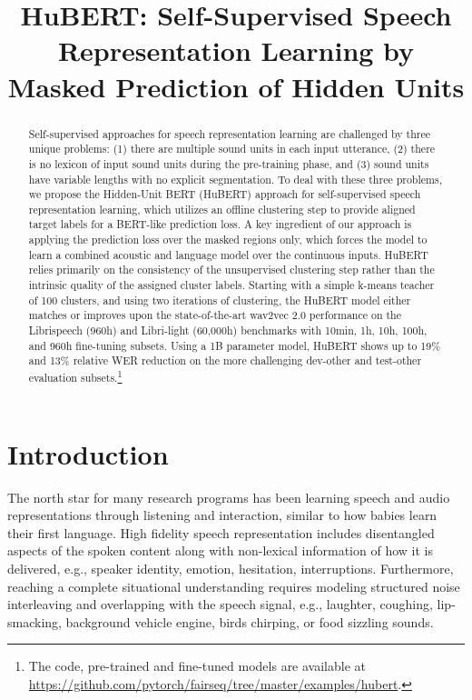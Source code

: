 \title{HuBERT: Self-Supervised Speech Representation Learning by Masked Prediction of Hidden Units}

\begin{abstract}
Self-supervised approaches for speech representation learning are challenged by three unique problems: (1) there are multiple sound units in each input utterance, (2) there is no lexicon of input sound units during the pre-training phase, and (3) sound units have variable lengths with no explicit segmentation. To deal with these three problems, we propose the Hidden-Unit BERT (HuBERT) approach for self-supervised speech representation learning, which utilizes an offline clustering step to provide aligned target labels for a BERT-like prediction loss. A key ingredient of our approach is applying the prediction loss over the masked regions only, which forces the model to learn a combined acoustic and language model over the continuous inputs. HuBERT relies primarily on the consistency of the unsupervised clustering step rather than the intrinsic quality of the assigned cluster labels. Starting with a simple k-means teacher of 100 clusters, and using two iterations of clustering, the HuBERT model either matches or improves upon the state-of-the-art wav2vec 2.0 performance on the Librispeech (960h) and Libri-light (60,000h) benchmarks with 10min, 1h, 10h, 100h, and 960h fine-tuning subsets. Using a 1B parameter model, HuBERT shows up to 19\% and 13\% relative WER reduction on the more challenging dev-other and test-other evaluation subsets.\footnote{The code, pre-trained and fine-tuned models are available at \url{https://github.com/pytorch/fairseq/tree/master/examples/hubert}.}
\end{abstract}

\section{Introduction}
\label{sec:intro}
The north star for many research programs has been learning speech and audio representations through listening and interaction, similar to how babies learn their first language. High fidelity speech representation includes disentangled aspects of the spoken content along with non-lexical information of how it is delivered, e.g., speaker identity, emotion, hesitation, interruptions. Furthermore, reaching a complete situational understanding requires modeling structured noise interleaving and overlapping with the speech signal, e.g., laughter, coughing, lip-smacking, background vehicle engine, birds chirping, or food sizzling sounds.

